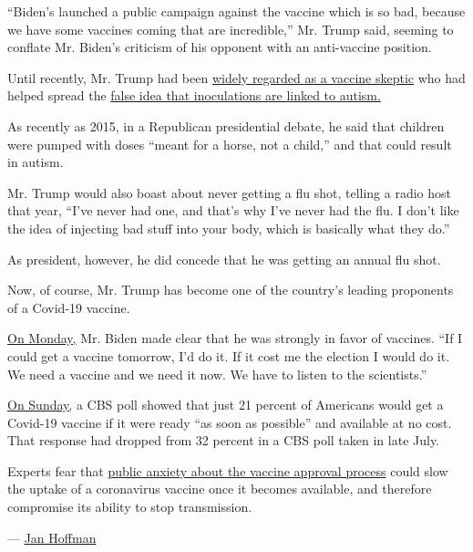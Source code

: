 ``Biden's launched a public campaign against the vaccine which is so
bad, because we have some vaccines coming that are incredible,'' Mr.
Trump said, seeming to conflate Mr. Biden's criticism of his opponent
with an anti-vaccine position.

Until recently, Mr. Trump had been
\href{https://www.nytimes3xbfgragh.onion/2020/03/09/health/trump-vaccines.html}{widely
regarded as a vaccine skeptic} who had helped spread the
\href{https://www.nytimes3xbfgragh.onion/2019/03/05/health/measles-vaccine-autism.html}{false
idea that inoculations are linked to autism.}

As recently as 2015, in a Republican presidential debate, he said that
children were pumped with doses ``meant for a horse, not a child,'' and
that could result in autism.

Mr. Trump would also boast about never getting a flu shot, telling a
radio host that year, ``I've never had one, and that's why I've never
had the flu. I don't like the idea of injecting bad stuff into your
body, which is basically what they do.''

As president, however, he did concede that he was getting an annual flu
shot.

Now, of course, Mr. Trump has become one of the country's leading
proponents of a Covid-19 vaccine.

\href{https://www.nytimes3xbfgragh.onion/live/2020/09/07/us/trump-vs-biden\#trump-lashes-at-biden-and-harris-claiming-they-politicized-his-accelerated-vaccine-timeline}{On
Monday,} Mr. Biden made clear that he was strongly in favor of vaccines.
``If I could get a vaccine tomorrow, I'd do it. If it cost me the
election I would do it. We need a vaccine and we need it now. We have to
listen to the scientists.''

\href{https://www.cbsnews.com/news/voters-covid-19-vaccine-opinion-poll/}{On
Sunday,} a CBS poll showed that just 21 percent of Americans would get a
Covid-19 vaccine if it were ready ``as soon as possible'' and available
at no cost. That response had dropped from 32 percent in a CBS poll
taken in late July.

Experts fear that
\href{https://www.nytimes3xbfgragh.onion/2020/07/18/health/coronavirus-anti-vaccine.html}{public
anxiety about the vaccine approval process} could slow the uptake of a
coronavirus vaccine once it becomes available, and therefore compromise
its ability to stop transmission.

--- \href{https://www.nytimes3xbfgragh.onion/by/jan-hoffman}{Jan
Hoffman}

